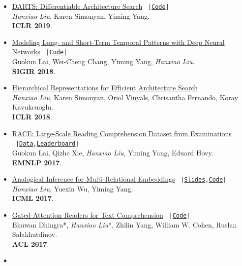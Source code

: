 \documentclass{article}
\begin{document}
\begin{itemize}
	\item 
		\href{https://arxiv.org/abs/1806.09055}{DARTS: Differentiable Architecture Search}
		\
		\texttt{\scriptsize |\href{https://github.com/quark0/darts}{Code}|} \\
		\emph{Hanxiao Liu}, Karen Simonyan, Yiming Yang. \\
		\textbf{ICLR 2019}.
	\item
		\href{https://arxiv.org/pdf/1703.07015.pdf}{Modeling Long- and Short-Term Temporal Patterns with Deep Neural Networks}
		\
		\texttt{\scriptsize |\href{https://github.com/laiguokun/LSTNet}{Code}|} \\
		Guokun Lai, Wei-Cheng Chang, Yiming Yang, \emph{Hanxiao Liu}. \\
		\textbf{SIGIR 2018}.
	\item 
		\href{https://arxiv.org/abs/1711.00436}{Hierarchical Representations for Efficient Architecture Search} \\
		\emph{Hanxiao Liu}, Karen Simonyan, Oriol Vinyals, Chrisantha Fernando, Koray Kavukcuoglu. \\
		\textbf{ICLR 2018}. \\
	\item 
		\href{https://arxiv.org/abs/1704.04683}{RACE: Large-Scale Reading Comprehension Dataset from Examinations}
		\
		\texttt{\scriptsize |\href{http://www.cs.cmu.edu/~glai1/data/race/}{Data},\href{http://www.qizhexie.com/data/RACE_leaderboard}{Leaderboard}|} \\
		Guokun Lai, Qizhe Xie, \emph{Hanxiao Liu}, Yiming Yang, Eduard Hovy. \\
		\textbf{EMNLP 2017}.
	\item 
		\href{https://arxiv.org/abs/1705.02426}{Analogical Inference for Multi-Relational Embeddings}
		\
		\texttt{\scriptsize |\href{slides/icml2017-liu.pdf}{Slides},\href{https://github.com/quark0/ANALOGY}{Code}|} \\
		\emph{Hanxiao Liu}, Yuexin Wu, Yiming Yang. \\
		\textbf{ICML 2017}.
	\item 
		\href{http://arxiv.org/abs/1606.01549}{Gated-Attention Readers for Text Comprehension}
		\
		\texttt{\scriptsize |\href{https://github.com/bdhingra/ga-reader}{Code}|}
		\\
		Bhuwan Dhingra*, \emph{Hanxiao Liu}*, Zhilin Yang, William W. Cohen, Ruslan Salakhutdinov. \\
		\textbf{ACL 2017}.
	\item

\end{itemize}
\end{document}
